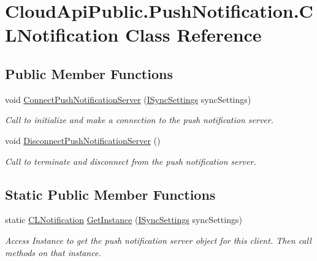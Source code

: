 \hypertarget{class_cloud_api_public_1_1_push_notification_1_1_c_l_notification}{\section{Cloud\-Api\-Public.\-Push\-Notification.\-C\-L\-Notification Class Reference}
\label{class_cloud_api_public_1_1_push_notification_1_1_c_l_notification}
}


 


\subsection*{Public Member Functions}
\begin{DoxyCompactItemize}
\item 
void \hyperlink{class_cloud_api_public_1_1_push_notification_1_1_c_l_notification_abd048f806309e9be145f026218946731}{Connect\-Push\-Notification\-Server} (\hyperlink{interface_cloud_api_public_1_1_interfaces_1_1_i_sync_settings}{I\-Sync\-Settings} sync\-Settings)
\begin{DoxyCompactList}\small\item\em Call to initialize and make a connection to the push notification server. \end{DoxyCompactList}\item 
void \hyperlink{class_cloud_api_public_1_1_push_notification_1_1_c_l_notification_a121fca2675b1ac57dac038554edf8fb9}{Disconnect\-Push\-Notification\-Server} ()
\begin{DoxyCompactList}\small\item\em Call to terminate and disconnect from the push notification server. \end{DoxyCompactList}\end{DoxyCompactItemize}
\subsection*{Static Public Member Functions}
\begin{DoxyCompactItemize}
\item 
static \hyperlink{class_cloud_api_public_1_1_push_notification_1_1_c_l_notification}{C\-L\-Notification} \hyperlink{class_cloud_api_public_1_1_push_notification_1_1_c_l_notification_ae43f349b8c7987fc76686b2f89f3223b}{Get\-Instance} (\hyperlink{interface_cloud_api_public_1_1_interfaces_1_1_i_sync_settings}{I\-Sync\-Settings} sync\-Settings)
\begin{DoxyCompactList}\small\item\em Access Instance to get the push notification server object for this client. Then call methods on that instance. \end{DoxyCompactList}\end{DoxyCompactItemize}
